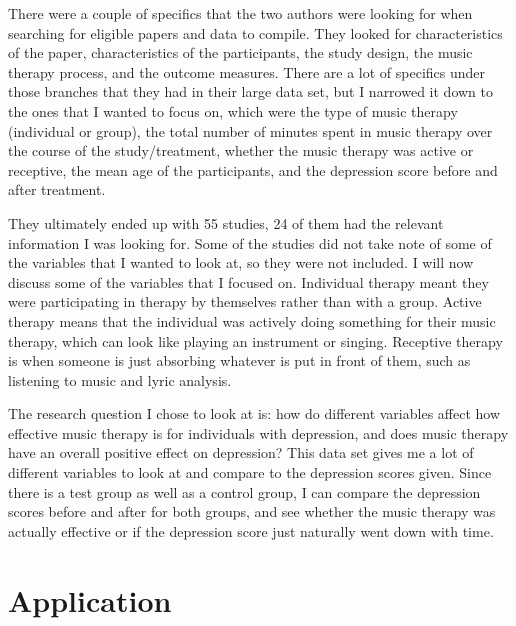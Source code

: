 \documentclass[12pt, titlepage]{article}
\begin{document}
 There were a couple of specifics that the two authors were looking for when searching for eligible papers and data to compile. They looked for characteristics of the paper, characteristics of the participants, the study design, the music therapy process, and the outcome measures. There are a lot of specifics under those branches that they had in their large data set, but I narrowed it down to the ones that I wanted to focus on, which were the type of music therapy (individual or group), the total number of minutes spent in music therapy over the course of the study/treatment, whether the music therapy was active or receptive, the mean age of the participants, and the depression score before and after treatment. 
 
 They ultimately ended up with 55 studies, 24 of them had the relevant information I was looking for.  Some of the studies did not take note of some of the variables that I wanted to look at, so they were not included. I will now discuss some of the variables that I focused on. Individual therapy meant they were participating in therapy by themselves rather than with a group. Active therapy means that the individual was actively doing something for their music therapy, which can look like playing an instrument or singing. Receptive therapy is when someone is just absorbing whatever is put in front of them, such as listening to music and lyric analysis. 
 
 The research question I chose to look at is: how do different variables affect how effective music therapy is for individuals with depression, and does music therapy have an overall positive effect on depression? This data set gives me a lot of different variables to look at and compare to the depression scores given. Since there is a test group as well as a control group, I can compare the depression scores before and after for both groups, and see whether the music therapy was actually effective or if the depression score just naturally went down with time.

 \newpage

 \section{Application} 
 \label{sec:application}
\end{document}
